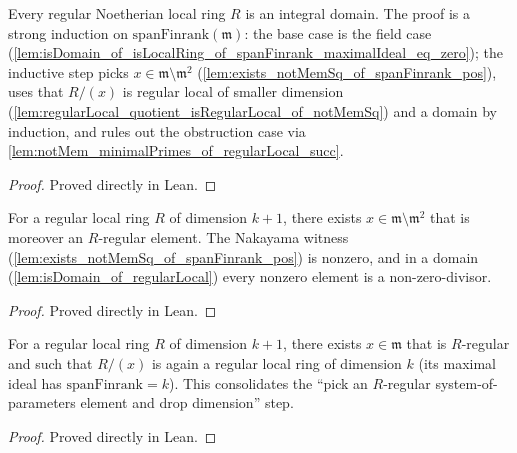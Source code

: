 \begin{lemma}
  \label{lem:isDomain_of_regularLocal}
  Every regular Noetherian local ring \(R\) is an integral domain. The proof is a strong
  induction on \(\text{spanFinrank}(\mathfrak m)\): the base case is the field case
  (\cref{lem:isDomain_of_isLocalRing_of_spanFinrank_maximalIdeal_eq_zero}); the inductive
  step picks \(x \in \mathfrak m \setminus \mathfrak m^2\)
  (\cref{lem:exists_notMemSq_of_spanFinrank_pos}), uses that \(R/(x)\) is regular local of
  smaller dimension (\cref{lem:regularLocal_quotient_isRegularLocal_of_notMemSq}) and a
  domain by induction, and rules out the obstruction case via
  \cref{lem:notMem_minimalPrimes_of_regularLocal_succ}.
\end{lemma}
\begin{proof}

\leanok
  Proved directly in Lean.
\end{proof}

\begin{lemma}
  \label{lem:exists_isSMulRegular_notMemSq_of_regularLocal_succ}
  For a regular local ring \(R\) of dimension \(k + 1\), there exists
  \(x \in \mathfrak m \setminus \mathfrak m^2\) that is moreover an \(R\)-regular element. The
  Nakayama witness (\cref{lem:exists_notMemSq_of_spanFinrank_pos}) is nonzero, and in a
  domain (\cref{lem:isDomain_of_regularLocal}) every nonzero element is a
  non-zero-divisor.
\end{lemma}
\begin{proof}

\leanok
  Proved directly in Lean.
\end{proof}

\begin{lemma}
  \label{lem:exists_isSMulRegular_quotient_isRegularLocal_succ}
  For a regular local ring \(R\) of dimension \(k + 1\), there exists \(x \in \mathfrak m\)
  that is \(R\)-regular and such that \(R / (x)\) is again a regular local ring of
  dimension \(k\) (its maximal ideal has \(\text{spanFinrank} = k\)). This consolidates the
  ``pick an \(R\)-regular system-of-parameters element and drop dimension'' step.
\end{lemma}
\begin{proof}

\leanok
  Proved directly in Lean.
\end{proof}


